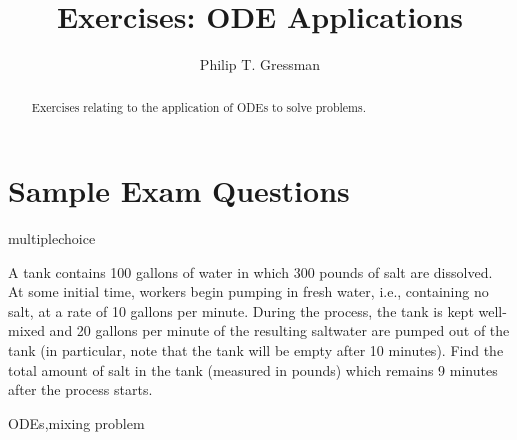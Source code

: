\documentclass{ximera}
\title{Exercises: ODE Applications}
\author{Philip T. Gressman}
\begin{document}
\begin{abstract}
Exercises relating to the application of ODEs to solve problems.
\end{abstract}
\maketitle

\section*{Sample Exam Questions}

\begin{question}[2016C.15]
\begin{type}
multiplechoice
\end{type}
A tank contains 100 gallons of water in which 300 pounds of salt are dissolved. At some initial time, workers begin pumping in fresh water, i.e., containing no salt, at a rate of 10 gallons per minute. During the process, the tank is kept well-mixed and 20 gallons per minute of the resulting saltwater are pumped out of the tank (in particular, note that the tank will be empty after 10 minutes). Find the total amount of salt in the tank (measured in pounds) which remains 9 minutes after the process starts.
\begin{multiplechoice}
\end{multiplechoice}
\begin{keywords}
ODEs,mixing problem
\end{keywords}
\end{question}
\end{document}
